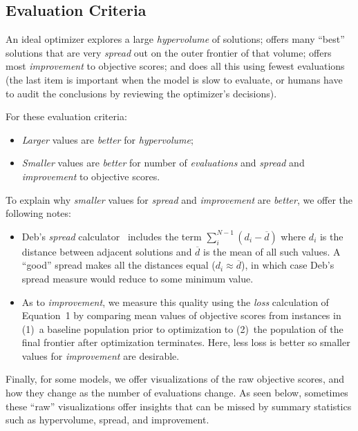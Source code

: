 \documentclass[10pt,journal,compsoc]{IEEEtran}
\newcommand{\bi}{\begin{itemize}}
\newcommand{\ei}{\end{itemize}}
\newenvironment{changed}{\par\color{MyDarkBlue}}{\par}
\begin{document}
\begin{changed}
\subsection{Evaluation Criteria}\label{sec:eval}
An ideal optimizer explores a  large {\em
  hypervolume} of solutions;  offers many  ``best''
solutions that are very {\em spread} out on the outer
frontier of that volume; 
offers most {\em improvement} to objective scores; and does all this
using fewest evaluations (the last item is  important when the model is slow to evaluate, or
humans have to audit the conclusions by reviewing the
optimizer's decisions).

For these evaluation criteria:
\bi
\item
{\em Larger} values are {\em better}  for {\em hypervolume};
\item 
{\em Smaller} values are {\em better}  for number of {\em evaluations} and {\em spread} and {\em improvement} to objective scores.
\ei
To explain why {\em smaller} values for {\em spread} and {\em improvement} are {\em better},
we offer the following notes:
\bi
\item
Deb's {\em spread} calculator~\cite{deb00afast} includes
the term 
$\sum_i^{N-1} (d_i - \overline{d})$ 
where $d_i$
is the distance between adjacent solutions and
$\overline{d}$ is the mean of all such values.  A
``good'' spread makes all the distances equal ($d_i
\approx \overline{d}$), in which case Deb's spread
measure would reduce to some minimum value.
\item
As to {\em improvement}, we measure this quality using the {\em loss} calculation
of Equation~1 
by  comparing mean values of objective scores from instances in (1)~a baseline population prior to optimization
to (2)~the population of the final frontier after optimization terminates.
Here, 
less loss is better so smaller values for {\em improvement} are desirable. 
\ei
Finally, for some models, we offer visualizations of the raw objective scores, and how they change
as the number of evaluations change. As seen below, sometimes these ``raw'' visualizations
offer insights that can be missed by summary statistics such as hypervolume, spread, and improvement. 
\end{changed}
\end{document}
